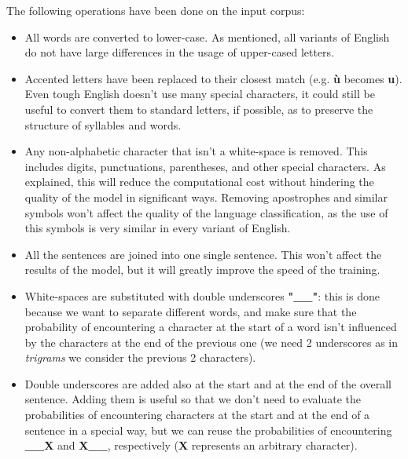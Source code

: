\documentclass[
12pt,
a4paper,
oneside,
headinclude,
footinclude]{article}
\theoremstyle{definition} %
\begin{document}
The following operations have been done on the input corpus:
\begin{itemize}
    \item All words are converted to lower-case. As mentioned, all variants of English do not have large differences in the usage of upper-cased letters.
    \item Accented letters have been replaced to their closest match (e.g. \textbf{ù} becomes \textbf{u}). Even tough English doesn't use many special characters, it could still be useful to convert them to standard letters, if possible, as to preserve the structure of syllables and words.
    \item Any non-alphabetic character that isn't a white-space is removed. This includes digits, punctuations, parentheses, and other special characters. As explained, this will reduce the computational cost without hindering the quality of the model in significant ways.
    Removing apostrophes and similar symbols won't affect the quality of the language classification, as the use of this symbols is very similar in every variant of English.
    \item All the sentences are joined into one single sentence. This won't affect the results of the model, but it will greatly improve the speed of the training.
    \item White-spaces are substituted with double underscores \textbf{"\_\_"}: this is done because we want to separate different words, and make sure that the probability of encountering a character at the start of a word isn't influenced by the characters at the end of the previous one (we need 2 underscores as in \textit{trigrams} we consider the previous 2 characters).
    \item Double underscores are added also at the start and at the end of the overall sentence. Adding them is useful so that we don't need to evaluate the probabilities of encountering characters at the start and at the end of a sentence in a special way, but we can reuse the probabilities of encountering \textbf{\_\_X} and \textbf{X\_\_}, respectively (\textbf{X} represents an arbitrary character).
\end{itemize} 
\end{document}
